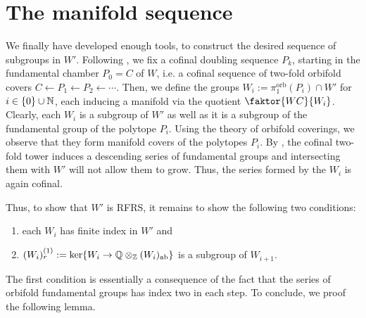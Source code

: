 
\newpage
\section{The manifold sequence}

We finally have developed enough tools, to construct the desired sequence of subgroups in \(W'\).
Following , we fix a cofinal doubling sequence \(P_k\), starting in the fundamental chamber \(P_0 = C\) of \(W\), i.e. a cofinal sequence of two-fold orbifold covers \(C \leftarrow P_1 \leftarrow P_2 \leftarrow \cdots\).
Then, we define the groups \(W_i := \pi_1^{\text{orb}}(P_i) \cap W'\) for \(i \in \{0\} \cup \mathbb{N}\), each inducing a manifold via the quotient \(\faktor{WC}{W_i}\).
Clearly, each \(W_i\) is a subgroup of \(W'\) as well as it is a subgroup of the fundamental group of the polytope \(P_i\).
Using the theory of orbifold coverings, we observe that they form manifold covers of the polytopes \(P_i\). %
By , the cofinal two-fold tower induces a descending series of fundamental groups and intersecting them with \(W'\) will not allow them to grow.
Thus, the series formed by the \(W_i\) is again cofinal.

\noindent
Thus, to show that \(W'\) is RFRS, it remains to show the following two conditions:
\begin{enumerate}
    \item each \(W_i\) has finite index in \(W'\) and
    \item \((W_i)_r^{(1)} := \ker\{W_i \to \mathbb{Q} \otimes_{\mathbb{Z}} (W_i)_{\text{ab}}\}\) is a subgroup of \(W_{i+1}\).
\end{enumerate}
The first condition is essentially a consequence of the fact that the series of orbifold fundamental groups has index two in each step.
To conclude, we proof the following lemma.

